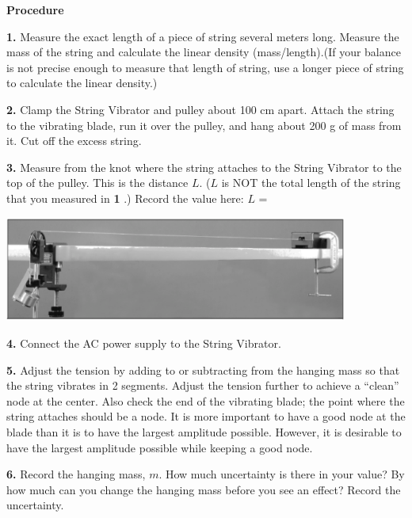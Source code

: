 \textbf{Procedure}

\textbf{1. } Measure the exact length of a piece of string several meters long. Measure the mass of the
string and calculate the linear density (mass/length).(If your balance is not precise enough to measure that length of string, use a longer
piece of string to calculate the linear density.)

\vspace{2cm}

\textbf{2. } Clamp the String Vibrator and pulley about 100 cm apart. Attach the string to the vibrating blade, run it over the pulley, and hang
about 200 g of mass from it. Cut off the excess string.

\textbf{3. } Measure from the knot where the string attaches to the String Vibrator to the top of the pulley.
This is the distance $L$. ($L$ is NOT the total length of the string that you measured in \textbf{1 }.) Record the value here: $L$ =

\vspace{0.3cm}
\begin{center}
\includegraphics[width=320pt]{standing_waves_strings/standing_waves_strings_fig3_tb.eps}
\end{center}
\vspace{0.3cm}

\textbf{4. } Connect the AC power supply to the String Vibrator.

\textbf{5. } Adjust the tension by adding to or subtracting from the hanging mass so that the string vibrates in 2 segments. Adjust the tension
further to achieve a ``clean'' node at the center. Also check the end of the vibrating blade; the point where the string attaches should be a node.
It is more important to have a good node at the blade than it is to have the largest amplitude possible. However, it is desirable to have the
largest amplitude possible while keeping a good node.

\textbf{6. } Record the hanging mass, $m$. How much uncertainty is there in your value? By how much can you change the hanging mass before you see
an effect? Record the uncertainty.

\vspace{3cm}

